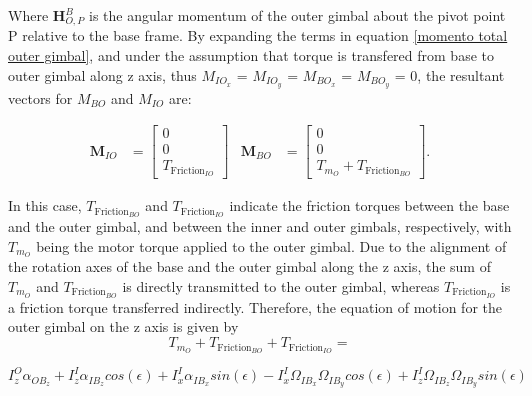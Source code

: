 Where $\mathbf{H}^B_{O,P}$ is the angular momentum of the outer gimbal about the pivot point P relative to the base frame. By expanding the terms in equation \ref{momento total outer gimbal}, and under the assumption that torque is transfered from base to outer gimbal along z axis, thus $M_{IO_x}$ = $M_{IO_y}$ = $M_{BO_x}$ = $M_{BO_y}$ = 0, the resultant vectors for $M_{BO}$ and $M_{IO}$ are:

\begin{align*}
     \mathbf{M}_{IO} &= \left[\begin{matrix}0 \\ 0 \\ T_{\text{Friction}_{IO}}\end{matrix}\right] & \mathbf{M}_{BO} &= \left[\begin{matrix}0 \\ 0 \\ T_{m_O} + T_{\text{Friction}_{BO}}\end{matrix}\right].
\end{align*}

In this case, $T_{\text{Friction}_{BO}}$ and $T_{\text{Friction}_{IO}}$ indicate the friction torques between the base and the outer gimbal, and between the inner and outer gimbals, respectively, with $T_{m_O}$ being the motor torque applied to the outer gimbal. Due to the alignment of the rotation axes of the base and the outer gimbal along the z axis, the sum of $T_{m_O}$ and $T_{\text{Friction}_{BO}}$ is directly transmitted to the outer gimbal, whereas $T_{\text{Friction}_{IO}}$ is a friction torque transferred indirectly. Therefore, the equation of motion for the outer gimbal on the z axis is given by
\begin{equation*}
   T_{m_O} + T_{\text{Friction}_{BO}} + T_{\text{Friction}_{IO}} = 
\end{equation*}

\begin{equation}
I^O_z \alpha_{{OB}_z} + I^I_z \alpha_{{IB}_z} cos(\epsilon) + I^I_x \alpha_{{IB}_x} sin(\epsilon) - I^I_x \Omega_{{IB}_x} \Omega_{{IB}_y}  cos(\epsilon) + I^I_z\Omega_{{IB}_z} \Omega_{{IB}_y} sin(\epsilon)
\end{equation}